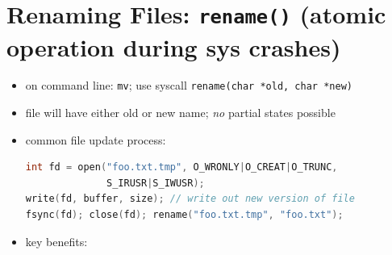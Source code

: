 \section*{Renaming Files: \texttt{rename()} (atomic operation during sys crashes)}
\begin{itemize}
\item on command line: \texttt{mv}; use syscall \texttt{rename(char *old, char *new)}
\item file will have either old or new name; \emph{no} partial states possible
\item common file update process:
\begin{lstlisting}[language=c]
int fd = open("foo.txt.tmp", O_WRONLY|O_CREAT|O_TRUNC,
              S_IRUSR|S_IWUSR);
write(fd, buffer, size); // write out new version of file
fsync(fd); close(fd); rename("foo.txt.tmp", "foo.txt");
\end{lstlisting}

\item key benefits:
\end{itemize}
